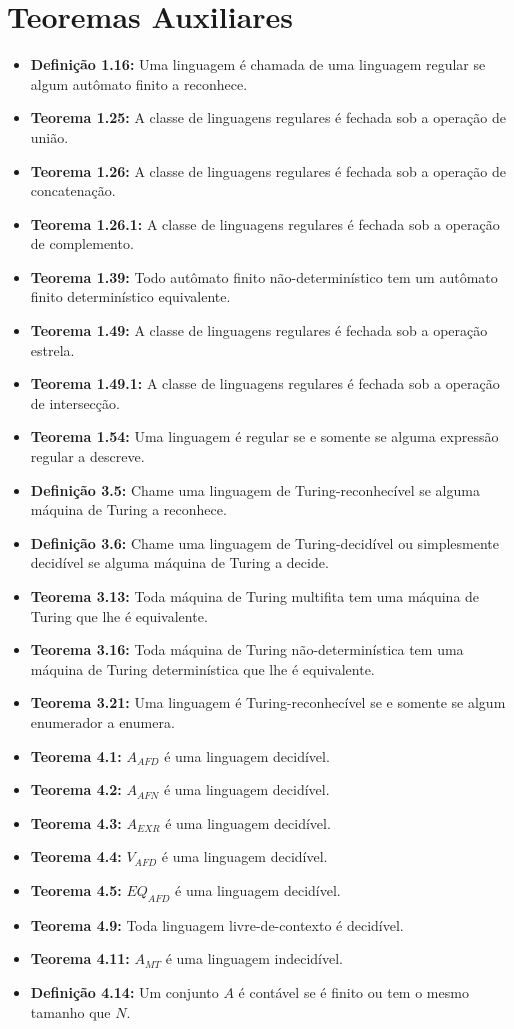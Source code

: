 \documentclass[12pt,a4paper,oneside]{article}
\begin{document}
\section*{Teoremas Auxiliares}

\begin{itemize}
	
	\item[] {\bf Definição 1.16:} Uma linguagem é chamada de uma linguagem regular se algum autômato finito a reconhece.
	\item[] {\bf Teorema 1.25:} A classe de linguagens regulares é fechada sob a operação de união.
	\item[] {\bf Teorema 1.26:} A classe de linguagens regulares é fechada sob a operação de concatenação.
	\item[] {\bf Teorema 1.26.1:} A classe de linguagens regulares é fechada sob a operação de complemento.
	\item[] {\bf Teorema 1.39:} Todo autômato finito não-determinístico tem um autômato finito determinístico
	equivalente.
	\item[] {\bf Teorema 1.49:} A classe de linguagens regulares é fechada sob a operação estrela.
	\item[] {\bf Teorema 1.49.1:} A classe de linguagens regulares é fechada sob a operação de intersecção.
	\item[] {\bf Teorema 1.54:} Uma linguagem é regular se e somente se alguma expressão regular a descreve.
	\item[] {\bf Definição 3.5:} Chame uma linguagem de Turing-reconhecível se alguma máquina de Turing a reconhece.
	\item[] {\bf Definição 3.6:} Chame uma linguagem de Turing-decidível ou simplesmente decidível se alguma máquina de Turing a decide.
	\item[] {\bf Teorema 3.13:} Toda máquina de Turing multifita tem uma máquina de Turing que lhe é equivalente.
	\item[] {\bf Teorema 3.16:} Toda máquina de Turing não-determinística tem uma máquina de Turing determinística que lhe é equivalente.
	\item[] {\bf Teorema 3.21:} Uma linguagem é Turing-reconhecível se e somente se algum enumerador a enumera.
	\item[] {\bf Teorema 4.1:} $A_{AFD}$ é uma linguagem decidível.
	\item[] {\bf Teorema 4.2:} $A_{AFN}$ é uma linguagem decidível.
	\item[] {\bf Teorema 4.3:} $A_{EXR}$ é uma linguagem decidível.
	\item[] {\bf Teorema 4.4:} $V_{AFD}$ é uma linguagem decidível.
	\item[] {\bf Teorema 4.5:} $EQ_{AFD}$ é uma linguagem decidível.
	\item[] {\bf Teorema 4.9:} Toda linguagem livre-de-contexto é decidível.
	\item[] {\bf Teorema 4.11:} $A_{MT}$ é uma linguagem indecidível.
	\item[] {\bf Definição 4.14:} Um conjunto $A$ é contável se é finito ou tem o mesmo tamanho que $N$.
\end{itemize}
\end{document}
